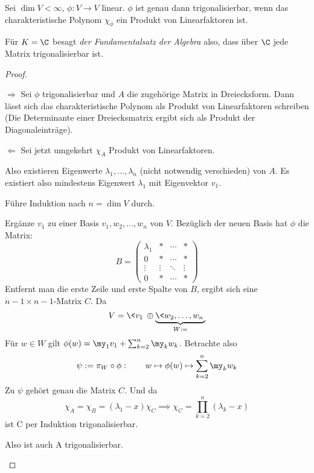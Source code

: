\documentclass[a4paper, 10pt]{scrbook}
\begin{document}
\begin{thm}
Sei $\dim V <\infty$, $\phi: V\to V$ linear.
$\phi$ ist genau dann trigonalisierbar, wenn das charakteristische Polynom $\chi_\phi$ ein Produkt von Linearfaktoren ist.
\begin{note}
Für $K=\C$ besagt \emph{der Fundamentalsatz der Algebra} also, dass über $\C$ jede Matrix trigonalisierbar ist.
\end{note}

\begin{proof}
	\begin{seg}{$\Longrightarrow$}
Sei $\phi$ trigonalisierbar und $A$ die zugehörige Matrix in Dreiecksform.
Dann lässt sich das charakteristische Polynom als Produkt von Linearfaktoren schreiben
(Die Determinante einer Dreiecksmatrix ergibt sich als Produkt der Diagonaleinträge).
\end{seg}
\begin{seg}{$\Longleftarrow$}
Sei jetzt umgekehrt $\chi_A$ Produkt von Linearfaktoren.

Also existieren Eigenwerte $\lambda_1, \dotsc, \lambda_n$ (nicht notwendig verschieden) von $A$.
Es existiert also mindestens Eigenwert $\lambda_1$ mit Eigenvektor $v_1$.

Führe Induktion nach $n=\dim V$ durch.

Ergänze $v_1$ zu einer Basis $v_1,w_2,\dotsc,w_n$ von $V$.
Bezüglich der neuen Basis hat $\phi$ die Matrix:
\[
B=\begin{pmatrix}\lambda_1 & * & \cdots & * \\
0 & * & \cdots & * \\
\vdots & \vdots & \ddots & \vdots \\
0 & * & \cdots & *
\end{pmatrix}
\]
Entfernt man die erste Zeile und erste Spalte von $B$, ergibt sich eine $n-1\times n-1$-Matrix $C$.
Da
\[
V=\<v_1\>\oplus \underbrace{\<w_2,\dotsc,w_n\>}_{W:=}
\]
Für $w\in W$ gilt $\phi(w)=\my_1v_1+\sum_{k=2}^n\my_kw_k$.
Betrachte also
\[
\psi := \pi_W \circ \phi:\qquad w\mapsto \phi(w)\mapsto \sum_{k=2}^n\my_kw_k
\]
Zu $\psi$ gehört genau die Matrix $C$.
Und da
\[
\chi_A= \chi_B = (\lambda_1-x)\chi_C \implies \chi_C = \prod_{k=2}^n(\lambda_k-x)
\]
ist C per Induktion trigonalisierbar.

Also ist auch A trigonalisierbar.
\end{seg}
\end{proof}
\end{thm}
\end{document}
